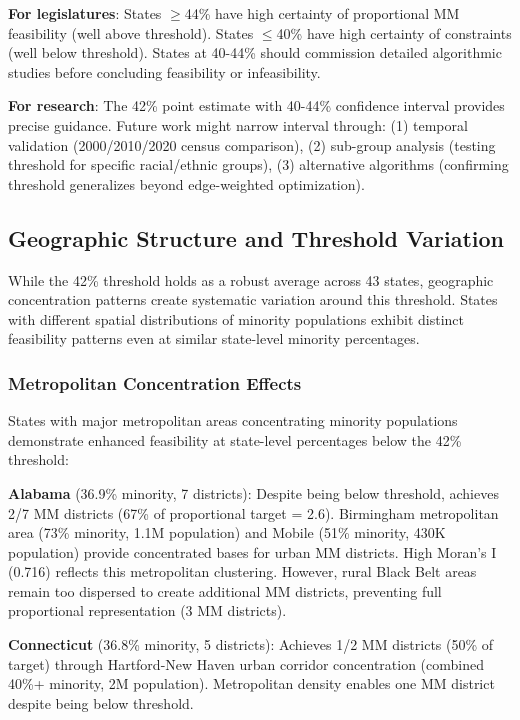 \textbf{For legislatures}: States $\geq$44\% have high certainty of proportional MM feasibility (well above threshold). States $\leq$40\% have high certainty of constraints (well below threshold). States at 40-44\% should commission detailed algorithmic studies before concluding feasibility or infeasibility.

\textbf{For research}: The 42\% point estimate with 40-44\% confidence interval provides precise guidance. Future work might narrow interval through: (1) temporal validation (2000/2010/2020 census comparison), (2) sub-group analysis (testing threshold for specific racial/ethnic groups), (3) alternative algorithms (confirming threshold generalizes beyond edge-weighted optimization).

\subsection{Geographic Structure and Threshold Variation}

While the 42\% threshold holds as a robust average across 43 states, geographic concentration patterns create systematic variation around this threshold. States with different spatial distributions of minority populations exhibit distinct feasibility patterns even at similar state-level minority percentages.

\subsubsection{Metropolitan Concentration Effects}

States with major metropolitan areas concentrating minority populations demonstrate enhanced feasibility at state-level percentages below the 42\% threshold:

\textbf{Alabama} (36.9\% minority, 7 districts): Despite being below threshold, achieves 2/7 MM districts (67\% of proportional target = 2.6). Birmingham metropolitan area (73\% minority, 1.1M population) and Mobile (51\% minority, 430K population) provide concentrated bases for urban MM districts. High Moran's I (0.716) reflects this metropolitan clustering. However, rural Black Belt areas remain too dispersed to create additional MM districts, preventing full proportional representation (3 MM districts).

\textbf{Connecticut} (36.8\% minority, 5 districts): Achieves 1/2 MM districts (50\% of target) through Hartford-New Haven urban corridor concentration (combined 40\%+ minority, 2M population). Metropolitan density enables one MM district despite being below threshold.

